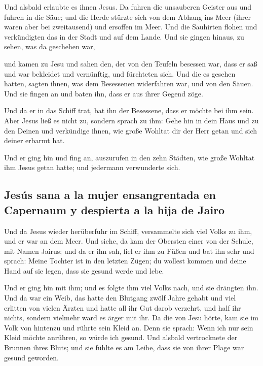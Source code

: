  Und alsbald erlaubte es ihnen Jesus. Da fuhren die
unsauberen Geister aus und fuhren in die Säue; und die Herde stürzte
sich von dem Abhang ins Meer (ihrer waren aber bei zweitausend) und
ersoffen im Meer.  Und die Sauhirten flohen und
verkündigten das in der Stadt und auf dem Lande. Und sie gingen hinaus,
zu sehen, was da geschehen war,

 und kamen zu Jesu und sahen den, der von den Teufeln
besessen war, dass er saß und war bekleidet und vernünftig, und
fürchteten sich.  Und die es gesehen hatten, sagten
ihnen, was dem Besessenen widerfahren war, und von den Säuen.
 Und sie fingen an und baten ihn, dass er aus ihrer
Gegend zöge.

 Und da er in das Schiff trat, bat ihn der Besessene,
dass er möchte bei ihm sein.  Aber Jesus ließ es nicht
zu, sondern sprach zu ihm: Gehe hin in dein Haus und zu den Deinen und
verkündige ihnen, wie große Wohltat dir der Herr getan und sich deiner
erbarmt hat.

 Und er ging hin und fing an, auszurufen in den zehn
Städten, wie große Wohltat ihm Jesus getan hatte; und jedermann
verwunderte sich.

\hypertarget{jesuxfas-sana-a-la-mujer-ensangrentada-en-capernaum-y-despierta-a-la-hija-de-jairo}{%
\subsection{Jesús sana a la mujer ensangrentada en Capernaum y despierta
a la hija de
Jairo}\label{jesuxfas-sana-a-la-mujer-ensangrentada-en-capernaum-y-despierta-a-la-hija-de-jairo}}

 Und da Jesus wieder herüberfuhr im Schiff, versammelte
sich viel Volks zu ihm, und er war an dem Meer.  Und
siehe, da kam der Obersten einer von der Schule, mit Namen Jairus; und
da er ihn sah, fiel er ihm zu Füßen  und bat ihn sehr und
sprach: Meine Tochter ist in den letzten Zügen; du wollest kommen und
deine Hand auf sie legen, dass sie gesund werde und lebe.

 Und er ging hin mit ihm; und es folgte ihm viel Volks
nach, und sie drängten ihn.  Und da war ein Weib, das
hatte den Blutgang zwölf Jahre gehabt  und viel erlitten
von vielen Ärzten und hatte all ihr Gut darob verzehrt, und half ihr
nichts, sondern vielmehr ward es ärger mit ihr.  Da die
von Jesu hörte, kam sie im Volk von hintenzu und rührte sein Kleid an.
 Denn sie sprach: Wenn ich nur sein Kleid möchte
anrühren, so würde ich gesund.  Und alsbald vertrocknete
der Brunnen ihres Bluts; und sie fühlte es am Leibe, dass sie von ihrer
Plage war gesund geworden.

